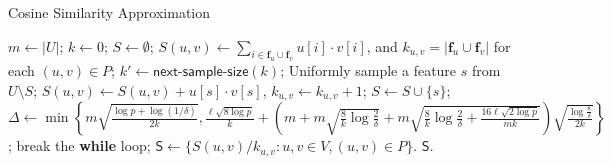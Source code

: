 \documentclass{article}
\begin{document}
\begin{algorithm}[!t]
\caption{\textsf{Cosine Similarity Approximation}}
\label{alg:csa}
\renewcommand{\algorithmicrequire}{\textbf{Input:}}
\renewcommand{\algorithmicensure}{\textbf{Output:}}
\begin{algorithmic}
\State $m \gets |U|$; $k \gets 0$; $S \gets \emptyset$;
\State $S(u,v) \gets \sum_{i\in \mathbf{f}_u \cup \mathbf{f}_v} u[i] \cdot v[i]$, and $k_{u,v} = |\mathbf{f}_u \cup \mathbf{f}_v|$ for each $(u, v) \in P$;
	\State $k' \gets \textsf{next-sample-size}(k)$;
		\State Uniformly sample a feature $s$ from $U\setminus S$;
				\State $S(u,v) \gets S(u,v)+u[s]\cdot v[s]$, $k_{u,v} \gets k_{u,v}+1$;
			\EndIf
		\EndFor
		\State $S \gets S\cup \{s\}$;
	\EndFor
	\State $\Delta \gets \min\left\{m\sqrt{\frac{\log p + \log(1/\delta)}{2k}}, \frac{\ell\sqrt{8\log p}}{k} +\left(m+m\sqrt{\frac{8}{k}\log \frac{2}{\delta}} + m\sqrt{\frac{8}{k}\log \frac{2}{\delta} + \frac{16\ell\sqrt{2\log p}}{mk}}\right)\sqrt{\frac{\log \frac{8}{\delta}}{2k}}\right\}$;
	\If {$\Delta \leq \epsilon$}
		\State break the {\bf while} loop;
	\EndIf
\EndWhile
\State $\mathsf{S} \gets \{S(u,v)/k_{u,v} : u,v\in V, (u,v)\in P\}$.
 $\mathsf{S}$.
\end{algorithmic}
\end{algorithm}
\end{document}
